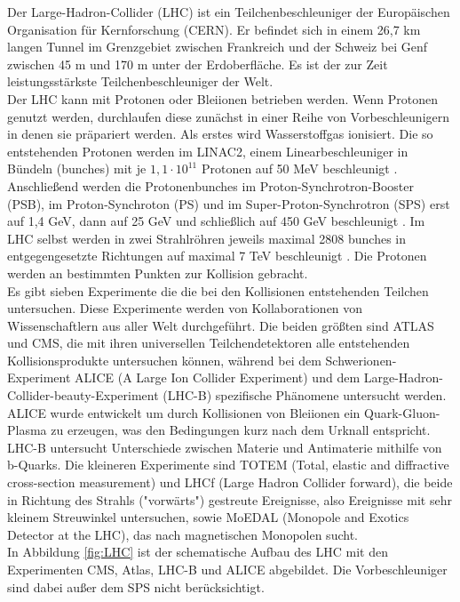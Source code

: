 Der Large-Hadron-Collider (LHC) ist ein Teilchenbeschleuniger der Europ\"aischen Organisation f\"ur Kernforschung (CERN). Er befindet sich in einem 26,7 km langen Tunnel im Grenzgebiet zwischen Frankreich und der Schweiz bei Genf zwischen 45 m und 170 m unter der Erdoberfl\"ache. Es ist der zur Zeit leistungsst\"arkste Teilchenbeschleuniger der Welt.\\
Der LHC kann mit Protonen oder Bleiionen betrieben werden. Wenn Protonen genutzt werden, durchlaufen diese zun\"achst in einer Reihe von Vorbeschleunigern in denen sie pr\"apariert werden. Als erstes wird Wasserstoffgas ionisiert. Die so entstehenden Protonen werden im LINAC2, einem Linearbeschleuniger in B\"undeln (bunches) mit je $1,1\cdot 10^{11}$ Protonen auf 50 MeV beschleunigt \cite{O'Luanaigh:1997427}. Anschlie\ss end werden die Protonenbunches im Proton-Synchrotron-Booster (PSB), im Proton-Synchroton (PS) und im Super-Proton-Synchrotron (SPS) erst auf 1,4 GeV, dann auf 25 GeV und schlie\ss lich auf 450 GeV beschleunigt \cite{O'Luanaigh:1997193}. Im LHC selbst werden in zwei Strahlr\"ohren jeweils maximal 2808 bunches in entgegengesetzte Richtungen auf maximal 7 TeV beschleunigt \cite{Lefevre:1165534}. Die Protonen werden an bestimmten Punkten zur Kollision gebracht. \\
Es gibt sieben Experimente die die bei den Kollisionen entstehenden Teilchen untersuchen. Diese Experimente werden von Kollaborationen von Wissenschaftlern aus aller Welt durchgef\"uhrt. Die beiden gr\"o\ss ten sind ATLAS und CMS, die mit ihren universellen Teilchendetektoren alle entstehenden Kollisionsprodukte untersuchen k\"onnen, w\"ahrend bei dem Schwerionen-Experiment ALICE (A Large Ion Collider Experiment) und dem Large-Hadron-Collider-beauty-Experiment (LHC-B) spezifische Ph\"anomene untersucht werden. ALICE wurde entwickelt um durch Kollisionen von Bleiionen ein Quark-Gluon-Plasma zu erzeugen, was den Bedingungen kurz nach dem Urknall entspricht. LHC-B untersucht Unterschiede zwischen Materie und Antimaterie mithilfe von b-Quarks. Die kleineren Experimente sind TOTEM (Total, elastic and diffractive cross-section measurement) und LHCf (Large Hadron Collider forward), die beide in Richtung des Strahls ("vorw\"arts") gestreute Ereignisse, also Ereignisse mit sehr kleinem Streuwinkel untersuchen, sowie MoEDAL (Monopole and Exotics Detector at the LHC), das nach magnetischen Monopolen sucht. \cite{O'Luanaigh:1997374, O'Luanaigh:1997265, O'Luanaigh:1997262, O'Luanaigh:1997259, O'Luanaigh:1997373, O'Luanaigh:1997527}\\
In Abbildung \ref{fig:LHC} ist der schematische Aufbau des LHC mit den Experimenten CMS, Atlas, LHC-B und ALICE abgebildet. Die Vorbeschleuniger sind dabei au\ss er dem SPS nicht ber\"ucksichtigt.


